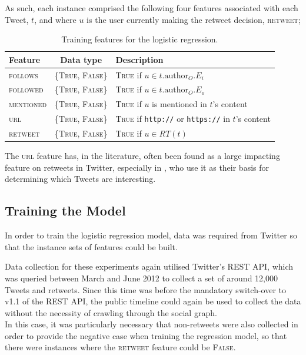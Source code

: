As such, each instance comprised the following four features associated with each Tweet, $t$, and where $u$ is the user currently making the retweet decision, \textsc{retweet};

\begin{table}[h]\footnotesize
\begin{center}
\begin{tabular}{ l | c | l }
	Feature & Data type & Description\\
	\hline
	\hline 
	\textsc{follows}    & \{\textsc{True, False}\} & \textsc{True} if $u \in t.\textrm{author}_O.E_i$\\
    \textsc{followed}   & \{\textsc{True, False}\} & \textsc{True} if $u \in t.\textrm{author}_O.E_o$\\
    \textsc{mentioned}  & \{\textsc{True, False}\} & \textsc{True} if $u$ is mentioned in $t$'s content\\
    \textsc{url}        & \{\textsc{True, False}\} & \textsc{True} if \texttt{http://} or \texttt{https://} in $t$'s content\\
    \hline 
    \textsc{retweet}    & \{\textsc{True, False}\} & \textsc{True} if $u \in RT(t)$\\ 
    \hline
\end{tabular}
\end{center}
\caption{Training features for the logistic regression.}
\label{table:logisticregressionfeatures}
\end{table}

The \textsc{url} feature has, in the literature, often been found as a large impacting feature on retweets in Twitter, especially in \cite{alonso10}, who use it as their basis for determining which Tweets are interesting.


\subsection{Training the Model}
In order to train the logistic regression model, data was required from Twitter so that the instance sets of features could be built. 

Data collection for these experiments again utilised Twitter's REST API, which was queried between March and June 2012 to collect a set of around 12,000 Tweets and retweets. Since this time was before the mandatory switch-over to v1.1 of the REST API, the public timeline could again be used to collect the data without the necessity of crawling through the social graph.\\
In this case, it was particularly necessary that non-retweets were also collected in order to provide the negative case when training the regression model, so that there were instances where the \textsc{retweet} feature could be \textsc{False}.

